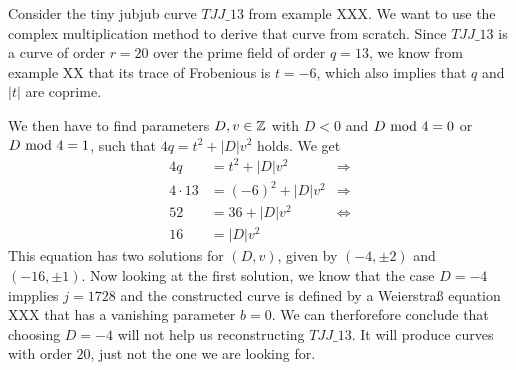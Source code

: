 \begin{example} Consider the tiny jubjub curve $\mathit{TJJ\_13}$ from example XXX. We want to use the complex multiplication method to derive that curve from scratch. Since $\mathit{TJJ\_13}$ is a curve of order $r=20$ over the prime field of order $q=13$, we know from example XX that its trace of Frobenious is $t=-6$, which also implies that $q$ and $|t|$ are coprime. 

We then have to find parameters $D,v\in\mathbb{Z}$ with $D<0$ and $D \text{ mod } 4=0$ or $D \text{ mod } 4=1$, such that $4q = t^2+ |D|v^2$ holds. We get
\begin{align*}
4q & = t^2+ |D|v^2 & \Rightarrow \\
4\cdot 13 & = (-6)^2+ |D|v^2 & \Rightarrow \\
52 & = 36 + |D|v^2 & \Leftrightarrow \\
16 & = |D|v^2
\end{align*}
This equation has two solutions for $(D,v)$, given by $(-4,\pm 2)$ and $(-16,\pm 1)$. Now looking at the first solution, we know that the case $D=-4$ impplies $j=1728$ and the constructed curve is defined by a Weierstraß equation XXX that has a vanishing parameter $b=0$. We can therforefore conclude that choosing $D=-4$ will not help us reconstructing $\mathit{TJJ\_13}$. It will produce curves with order $20$, just not the one we are looking for.


\end{example}
